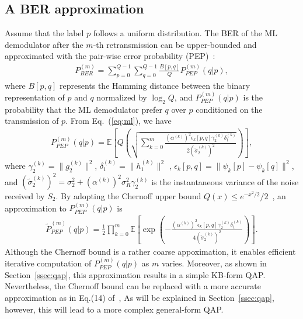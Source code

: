 \documentclass[journal]{IEEEtran}
\begin{document}
\subsection{A BER approximation}
\label{ssec:ber}
Assume that the label $p$ follows a uniform distribution. The BER of
the ML demodulator after the $m$-th retransmission can be upper-bounded and
approximated with the pair-wise error probability (PEP)~\cite{harvind2005symbol}:
\begin{align}
  P_{BER}^{(m)} = \sum_{p=0}^{Q - 1}\sum_{q=0}^{Q - 1}\frac{B[p,
  q]}{Q}P_{PEP}^{(m)}(q|p), \label{eq:P_BER}
\end{align}
where $B[p,q]$ represents the Hamming distance between the binary representation
of $p$ and $q$ normalized by $\log_2Q$, and $P_{PEP}^{(m)}(q|p)$ is the
probability that the ML demodulator prefer $q$ over $p$ conditioned on the
transmission of $p$. From Eq.~(\ref{eq:ml}), we have
\begin{align}
  P_{PEP}^{(m)}(q|p) = \mathbb{E}
  \left[Q\left(\sqrt{\sum_{k=0}^m \frac{(\alpha^{(k)})^2\epsilon_k[p,q]
  \gamma_2^{(k)} \delta_1^{(k)}} {2(\tilde{\sigma}_2^{(k)})^2}}\right)\right],
  \label{eq:PEP_m}
\end{align}
where $\gamma_2^{(k)} = \|g_2^{(k)}\|^2$, $\delta_1^{(k)} = \|h_1^{(k)}\|^2$
, $\epsilon_k[p,q] = \|\psi_k[p]-\psi_k[q]\|^2$, and $(\tilde{\sigma}_2^{(k)})^2
= \sigma_2^2+(\alpha^{(k)})^2\sigma_R^2\gamma_2^{(k)}$ is the instantaneous
variance of the noise received by $S_2$. By adopting the Chernoff upper bound
$Q(x)\leq e^{-x^2/2}/2$~\cite{proakisdigital}, an approximation to
$P_{PEP}^{(m)}(q|p)$ is
\begin{align}
  \tilde{P}_{PEP}^{(m)}(q|p) = \frac{1}{2}\prod_{k=0}^{m} \mathbb{E}
  \left[\exp\left( 
  -\frac{(\alpha^{(k)})^2\epsilon_k[p,q]\gamma_2^{(k)} \delta_1^{(k)}}
  {4(\tilde{\sigma}_2^{(k)})^2}
  \right)\right].
  \label{eq:PEP_m_approx}
\end{align}
Although the Chernoff bound is a rather coarse appoximation, it
enables efficient iterative computation of $P_{PEP}^{(m)}(q|p)$ as $m$ varies.
Moreover, as shown in Section~\ref{ssec:qap}, this approximation results in a
simple KB-form QAP. Nevertheless, the Chernoff bound can be replaced
with a more accurate approximation as in Eq.(14) of~\cite{chiani2003new},
As will be explained in Section~\ref{ssec:qap}, however, this will lead to a
more complex general-form QAP.
\end{document}

